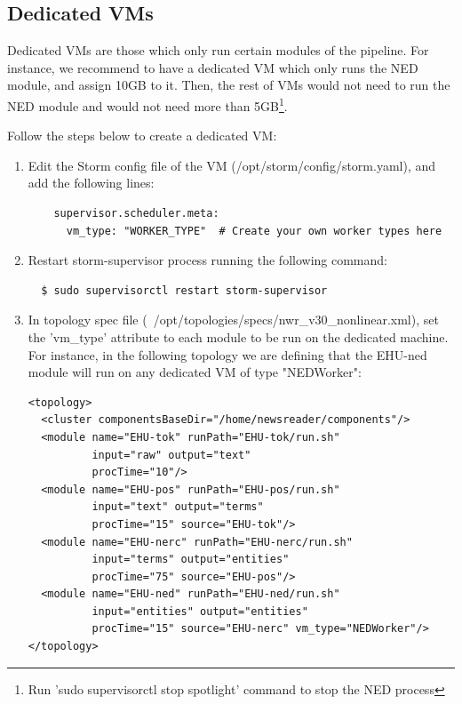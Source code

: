 \documentclass[a4]{article}
\begin{document}
\subsection{Dedicated VMs}
\label{sec:dedicated}

Dedicated VMs are those which only run certain modules of the
pipeline. For instance, we recommend to have a dedicated VM which only
runs the NED module, and assign 10GB to it. Then, the rest of VMs
would not need to run the NED module and would not need more than
5GB\footnote{Run 'sudo supervisorctl stop spotlight' command to stop
  the NED process}.

Follow the steps below to create a dedicated VM:

\begin{enumerate}
\item Edit the Storm config file of the VM
  (/opt/storm/config/storm.yaml), and add the following lines:

  \begin{verbatim}
    supervisor.scheduler.meta:
      vm_type: "WORKER_TYPE"  # Create your own worker types here
  \end{verbatim}

\item Restart storm-supervisor process running the following command:

\begin{verbatim}
  $ sudo supervisorctl restart storm-supervisor
\end{verbatim}

\item In topology spec file
  (~/opt/topologies/specs/nwr\_v30\_nonlinear.xml), set the 'vm\_type'
  attribute to each module to be run on the dedicated machine. For
  instance, in the following topology we are defining that the EHU-ned
  module will run on any dedicated VM of type "NEDWorker":

  \begin{lstlisting}
<topology>
  <cluster componentsBaseDir="/home/newsreader/components"/>
  <module name="EHU-tok" runPath="EHU-tok/run.sh"
          input="raw" output="text"
          procTime="10"/>
  <module name="EHU-pos" runPath="EHU-pos/run.sh"
          input="text" output="terms"
          procTime="15" source="EHU-tok"/>
  <module name="EHU-nerc" runPath="EHU-nerc/run.sh"
          input="terms" output="entities"
          procTime="75" source="EHU-pos"/>
  <module name="EHU-ned" runPath="EHU-ned/run.sh"
          input="entities" output="entities"
          procTime="15" source="EHU-nerc" vm_type="NEDWorker"/>
</topology>
\end{lstlisting}


\end{enumerate}
\end{document}
